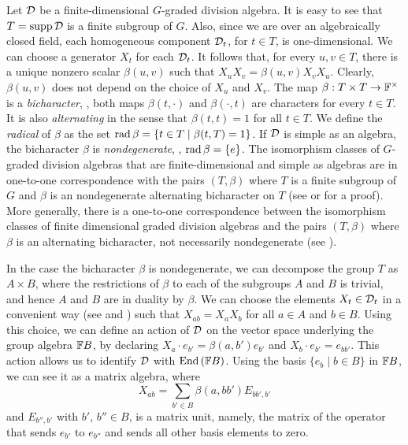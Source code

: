 Let $\mathcal{D}$ be a finite-dimensional $G$-graded division algebra. It is easy to see that $T= \operatorname{supp} \mathcal{D}$ is a finite subgroup of $G$.
Also, since we are over an algebraically closed field, each homogeneous component $\mathcal{D}_t$, for $t\in T$, is one-dimensional. We can choose a generator $X_t$ for each $\mathcal{D}_t$. It follows that, for every $u,v\in T$, there is a unique nonzero scalar $\beta (u,v)$ such that $X_u X_v = \beta (u,v) X_v X_u$. Clearly, $\beta (u,v)$ does not depend on the choice of $X_u$ and $X_v$.
The map $\beta: T\times T \rightarrow \mathbb{F}^{\times}$ is a \emph{bicharacter}, \ie, both maps $\beta(t,\cdot)$ and $\beta(\cdot,t)$ are characters for every $t \in T$. It is also \emph{alternating} in the sense that $\beta (t,t) = 1$ for all $t\in T$. We define the \emph{radical} of $\beta$ as the set $\operatorname{rad} \beta = \{ t\in T \mid \beta(t, T) = 1 \}$.
If $\mathcal{D}$ is simple as an algebra, the bicharacter $\beta$ is \emph{nondegenerate}, \ie, $\operatorname{rad} \beta = \{e\} $.
The isomorphism classes of $G$-graded division algebras that are finite-dimensional and simple as algebras are in one-to-one correspondence with the pairs $(T,\beta)$ where $T$ is a finite subgroup of $G$ and $\beta$ is an nondegenerate alternating bicharacter on $T$ (see \cite{BK10} or \cite[Section 2.2]{livromicha} for a proof).
More generally, there is a one-to-one correspondence between the isomorphism classes of finite dimensional graded division algebras and the pairs $(T,\beta)$ where $\beta$ is an alternating bicharacter, not necessarily nondegenerate (see \cite{EK_d4}).

In the case the bicharacter $\beta$ is nondegenerate, we can decompose the group $T$ as $A\times B$, where the restrictions of $\beta$ to each of the subgroups $A$ and $B$ is trivial, and hence $A$ and $B$ are in duality by $\beta$. We can choose the elements $X_t\in \mathcal{D}_t$ in a convenient way (see \cite[Remark 2.16]{livromicha} and
\cite[Remark 18]{EK15}) such that $X_{ab}=X_aX_b$ for all $a\in A$ and $b\in B$. Using this choice, we can define an action of $\mathcal{D}$ on the vector space underlying the group algebra $\mathbb{F} B$, by declaring $X_a\cdot e_{b'} = \beta(a, b') e_{b'}$ and $X_b\cdot e_{b'} = e_{bb'}$.
This action allows us to identify $\mathcal{D}$ with $\operatorname{End}{(\mathbb{F} B)}$. Using the basis $\{e_{b}\mid b\in B\}$ in $\mathbb{F} B$, we can see it as a matrix algebra, where
%
\[X_{ab}= \sum_{b'\in B} \beta(a, bb') E_{bb', b'}\]
%
and $E_{b'', b'}$ with $b'$, $b'' \in B$, is a matrix unit, namely, the matrix of the operator that sends $e_{b'}$ to $e_{b''}$ and sends all other basis elements to zero.


